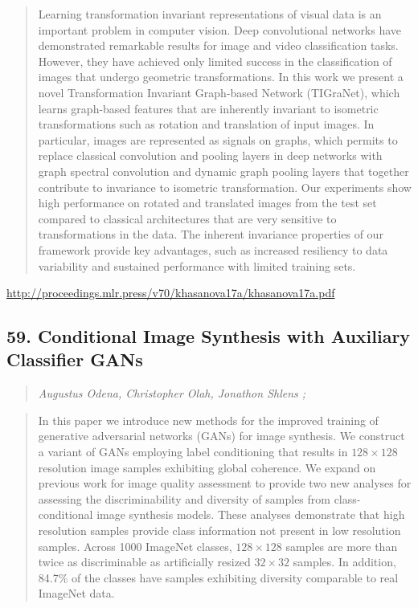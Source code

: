 \documentclass{article}
\begin{document}
\begin{quote}
    Learning transformation invariant representations of visual data is an important problem in computer vision. Deep convolutional networks have demonstrated remarkable results for image and video classification tasks. However, they have achieved only limited success in the classification of images that undergo geometric transformations. In this work we present a novel Transformation Invariant Graph-based Network (TIGraNet), which learns graph-based features that are inherently invariant to isometric transformations such as rotation and translation of input images. In particular, images are represented as signals on graphs, which permits to replace classical convolution and pooling layers in deep networks with graph spectral convolution and dynamic graph pooling layers that together contribute to invariance to isometric transformation. Our experiments show high performance on rotated and translated images from the test set compared to classical architectures that are very sensitive to transformations in the data. The inherent invariance properties of our framework provide key advantages, such as increased resiliency to data variability and sustained performance with limited training sets.  
\end{quote}

\href{http://proceedings.mlr.press/v70/khasanova17a/khasanova17a.pdf}{http://proceedings.mlr.press/v70/khasanova17a/khasanova17a.pdf}

\subsection{59. Conditional Image Synthesis with Auxiliary Classifier GANs}

\begin{quote}
\footnotesize{\textit{Augustus Odena, Christopher Olah, Jonathon Shlens ;}}

\end{quote}

\begin{quote}
    In this paper we introduce new methods for the improved training of generative adversarial networks (GANs) for image synthesis. We construct a variant of GANs employing label conditioning that results in $128\times 128$ resolution image samples exhibiting global coherence. We expand on previous work for image quality assessment to provide two new analyses for assessing the discriminability and diversity of samples from class-conditional image synthesis models. These analyses demonstrate that high resolution samples provide class information not present in low resolution samples. Across 1000 ImageNet classes, $128\times 128$ samples are more than twice as discriminable as artificially resized $32\times 32$ samples. In addition, 84.7\% of the classes have samples exhibiting diversity comparable to real ImageNet data.  
\end{quote}
\end{document}
